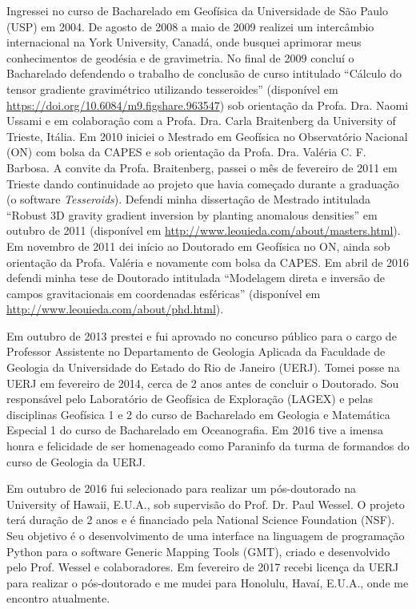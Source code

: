 \documentclass[12pt,a4paper,oneside,titlepage,onecolumn]{article}
\begin{document}
Ingressei no curso de Bacharelado em Geofísica da Universidade de São
Paulo (USP) em 2004.
De agosto de 2008 a maio de 2009 realizei um intercâmbio internacional na York
University, Canadá, onde busquei aprimorar meus conhecimentos de geodésia e de
gravimetria.
No final de 2009 concluí o Bacharelado defendendo o trabalho de conclusão de
curso intitulado
``Cálculo do tensor gradiente gravimétrico utilizando tesseroides''
(disponível em \url{https://doi.org/10.6084/m9.figshare.963547})
sob orientação da Profa. Dra. Naomi Ussami e em colaboração com a
Profa. Dra. Carla Braitenberg da University of Trieste, Itália.
Em 2010 iniciei o Mestrado em Geofísica no Observatório Nacional (ON) com bolsa
da CAPES e sob orientação da Profa. Dra. Valéria C. F. Barbosa.
A convite da Profa. Braitenberg, passei o mês de fevereiro de 2011 em Trieste
dando continuidade ao projeto que havia começado durante a graduação
(o software {\em Tesseroids}).
Defendi minha dissertação de Mestrado intitulada ``Robust 3D gravity gradient
inversion by planting anomalous densities'' em outubro de 2011 (disponível em
\url{http://www.leouieda.com/about/masters.html}).
Em novembro de 2011 dei início ao Doutorado em Geofísica no ON, ainda sob
orientação da Profa. Valéria e novamente com bolsa da CAPES.
Em abril de 2016 defendi minha tese de Doutorado intitulada ``Modelagem direta
e inversão de campos gravitacionais em coordenadas esféricas''
(disponível em \url{http://www.leouieda.com/about/phd.html}).

Em outubro de 2013 prestei e fui aprovado no concurso público para o cargo de
Professor Assistente no Departamento de Geologia Aplicada da Faculdade de
Geologia da Universidade do Estado do Rio de Janeiro (UERJ).
Tomei posse na UERJ em fevereiro de 2014, cerca de 2 anos antes de concluir o
Doutorado.
Sou responsável pelo Laboratório de Geofísica de Exploração (LAGEX) e pelas
disciplinas Geofísica 1 e 2 do curso de Bacharelado em Geologia e Matemática
Especial 1 do curso de Bacharelado em Oceanografia.
Em 2016 tive a imensa honra e felicidade de ser homenageado como Paraninfo da
turma de formandos do curso de Geologia da UERJ.

Em outubro de 2016 fui selecionado para realizar um pós-doutorado na University
of Hawaii, E.U.A., sob supervisão do Prof. Dr. Paul Wessel.
O projeto terá duração de 2 anos e é financiado pela National Science
Foundation (NSF).
Seu objetivo é o desenvolvimento de uma interface na linguagem de programação
Python para o software Generic Mapping Tools (GMT), criado e desenvolvido pelo
Prof. Wessel e colaboradores.
Em fevereiro de 2017 recebi licença da UERJ para realizar o pós-doutorado e me
mudei para Honolulu, Havaí, E.U.A., onde me encontro atualmente.
\end{document}
